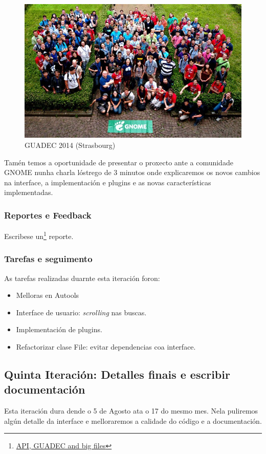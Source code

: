 \begin{figure}[h!]
    \centering
    \includegraphics[width=0.999\textwidth]{img/guadec_2014.jpg}
    \caption{GUADEC 2014 (Strasbourg)}
    \label{fig:guadec2012}
\end{figure}

Tamén temos a oportunidade de presentar o proxecto ante a comunidade GNOME nunha charla lóstrego de 3 minutos onde explicaremos os novos cambios na interface, a implementación e plugins e as novas características implementadas.

\subsubsection{Reportes e Feedback}

Escribese un\footnote{\href{http://aquelando.info/api-guadec-and-big-files/}{API, GUADEC and big files}} reporte.

\subsubsection{Tarefas e seguimento}

As tarefas realizadas duarnte esta iteración foron:

\begin{itemize}
  \item Melloras en Autools
  \item Interface de usuario: \emph{scrolling} nas buscas.
  \item Implementación de plugins.
  \item Refactorizar clase File: evitar dependencias coa interface.
\end{itemize}

\subsection{Quinta Iteración: Detalles finais e escribir documentación}
Esta iteración dura dende o 5 de Agosto ata o 17 do mesmo mes. Nela puliremos algún detalle da interface e melloraremos a calidade do código e a documentación.

